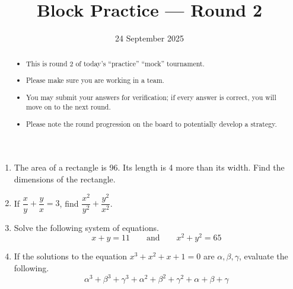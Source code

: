 \documentclass{tufte-handout}
\title{Block Practice — Round 2}
\author[IA Math Team]{}
\date{24 September 2025}
\begin{document}
\maketitle

\begin{abstract}
\begin{itemize}
\item This is round $2$ of today's ``practice'' ``mock'' tournament.
\item Please make sure you are working in a team.
\item You may submit your answers for verification; if every answer is correct, you will move on to the next round.
\item Please note the round progression on the board to potentially develop a strategy.
\end{itemize}
\end{abstract}

\vspace{4em}

\begin{enumerate}
    \setlength{\itemsep}{7em}
    \item The area of a rectangle is 96. Its length is 4 more than its width. Find the dimensions of the rectangle. 
    \item If $\dfrac{x}y+\dfrac{y}x=3$, find $\dfrac{x^2}{y^2}+\dfrac{y^2}{x^2}$. 
    \item Solve the following system of equations.
    \[x+y=11\qquad\text{and}\qquad x^2+y^2=65\]
    \item If the solutions to the equation $x^3+x^2+x+1=0$ are $\alpha, \beta, \gamma$, evaluate the following.
    \[
        \alpha^3+\beta^3+\gamma^3+\alpha^2+\beta^2+\gamma^2+\alpha+\beta+\gamma
    \]
\end{enumerate}
\end{document}
